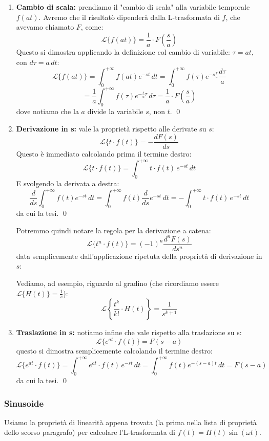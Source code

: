 \documentclass[a4paper,11pt]{article}
\begin{document}
\begin{enumerate}
	\item \textbf{Cambio di scala:} prendiamo il "cambio di scala" alla variabile temporale $f(at)$. Avremo che il risultatò dipenderà dalla L-trasformata di $f$, che avevamo chiamato $F$, come:
		$$
			\mathcal{L}\{f(at)\} = \frac{1}{a} \cdot F\left(\frac{s}{a}\right) 
		$$
		Questo si dimostra applicando la definizione col cambio di variabile: $\tau = at$, con $d\tau = a \, dt$:
		$$
		\mathcal{L}\{f(at) \} = \int_0^{+ \infty} f(at) e^{-st} \, dt = \int_0^{+ \infty} f(\tau) e^{-s \frac{\tau}{a}} \frac{d\tau}{a}
		$$
		$$
		= \frac{1}{a} \int_0^{+ \infty} f(\tau) e^{-\frac{s}{a} \tau} \, d\tau = \frac{1}{a} \cdot F\left( \frac{s}{a} \right)
		$$
		dove notiamo che la $a$ divide la variabile $s$, non $t$. \qed
	\item \textbf{Derivazione in s:} vale la proprietà rispetto alle derivate su $s$:
		$$
			\mathcal{L}\{t \cdot f(t)\} = - \frac{d F(s)}{ds}
		$$
		Questo è immediato calcolando prima il termine destro:
		$$
			\mathcal{L}\{t \cdot f(t)\} = \int_0^{+\infty} t \cdot f(t) \, e^{-st} \, dt
		$$
		E svolgendo la derivata a destra:
		$$
			\frac{d}{ds} \int_0^{+\infty} f(t) e^{-st} \, dt = \int_0^{+\infty} f(t) \frac{d}{ds}e^{-st} \, dt = -\int_0^{+\infty} t \cdot f(t) \, e^{-st} \, dt
		$$ 
		da cui la tesi. \qed

		Potremmo quindi notare la regola per la derivazione a catena:
		$$
			\mathcal{L}\{t^n \cdot f(t)\} = (-1)^n \frac{d^n F(s)}{ds^n}
		$$
		data semplicemente dall'applicazione ripetuta della proprietà di derivazione in $s$:
		
		Vediamo, ad esempio, riguardo al gradino (che ricordiamo essere $\mathcal{L}\{H(t)\} = \frac{1}{s}$):
		$$
		\mathcal{L}\left\{ \frac{t^k}{k!} \cdot H(t) \right\} = \frac{1}{s^{k + 1}}
		$$
	\item \textbf{Traslazione in s:} notiamo infine che vale rispetto alla traslazione su s:
		$$
		\mathcal{L}\{ e^{at} \cdot f(t) \} = F(s - a) 
		$$
		questo si dimostra semplicemente calcolando il termine destro:
		$$
		\mathcal{L}\{ e^{at} \cdot f(t) \} = \int_0^{+\infty} e^{at} \cdot f(t) \, e^{-st} \, dt = \int_0^{+\infty} f(t) e^{-(s - a)t} \, dt = F(s - a)
		$$ 
		da cui la tesi. \qed
\end{enumerate}

\subsubsection{Sinusoide}
Usiamo la proprietà di linearità appena trovata (la prima nella lista di proprietà dello scorso paragrafo) per calcolare l'L-trasformata di $f(t) = H(t)\sin(\omega t)$.
\end{document}
